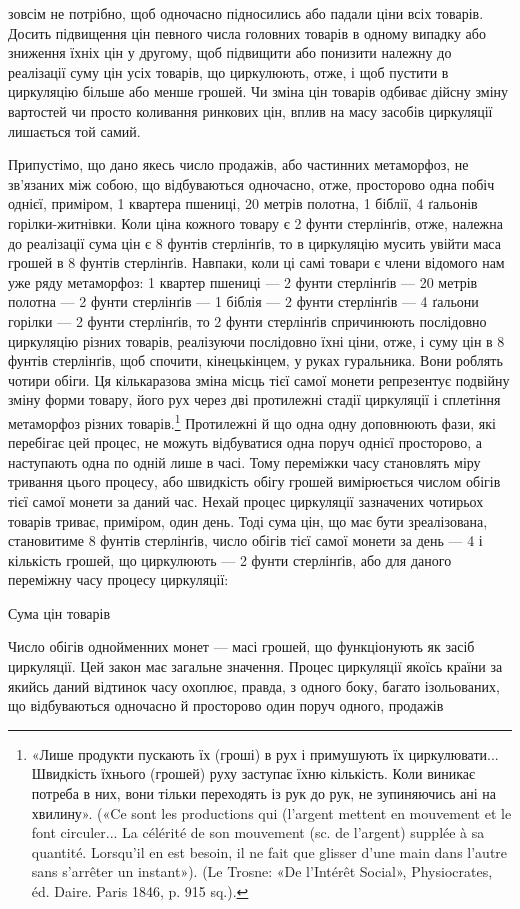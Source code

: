 зовсім не потрібно, щоб одночасно підносились або падали ціни
всіх товарів. Досить підвищення цін певного числа головних
товарів в одному випадку або зниження їхніх цін у другому,
щоб підвищити або понизити належну до реалізації суму цін
усіх товарів, що циркулюють, отже, і щоб пустити в циркуляцію
більше або менше грошей. Чи зміна цін товарів одбиває дійсну
зміну вартостей чи просто коливання ринкових цін, вплив на
масу засобів циркуляції лишається той самий.

Припустімо, що дано якесь число продажів, або частинних
метаморфоз, не зв’язаних між собою, що відбуваються одночасно,
отже, просторово одна побіч однієї, приміром, 1 квартера пшениці,
20 метрів полотна, 1 біблії, 4 ґальонів горілки-житнівки. Коли
ціна кожного товару є 2 фунти стерлінґів, отже, належна до реалізації
сума цін є 8 фунтів стерлінґів, то в циркуляцію мусить
увійти маса грошей в 8 фунтів стерлінґів. Навпаки, коли ці самі
товари є члени відомого нам уже ряду метаморфоз: 1 квартер
пшениці — 2 фунти стерлінґів — 20 метрів полотна — 2 фунти
стерлінґів — 1 біблія — 2 фунти стерлінґів — 4 ґальони горілки —
2 фунти стерлінґів, то 2 фунти стерлінґів спричинюють послідовно
циркуляцію різних товарів, реалізуючи послідовно їхні
ціни, отже, і суму цін в 8 фунтів стерлінґів, щоб спочити, кінецькінцем,
у руках гуральника. Вони роблять чотири обіги. Ця
кількаразова зміна місць тієї самої монети репрезентує подвійну
зміну форми товару, його рух через дві протилежні стадії циркуляції
і сплетіння метаморфоз різних товарів.\footnote{
«Лише продукти пускають їх (гроші) в рух і примушують їх
циркулювати... Швидкість їхнього (грошей) руху заступає їхню кількість.
Коли виникає потреба в них, вони тільки переходять із рук до рук, не
зупиняючись ані на хвилину». («Ce sont les productions qui (l’argent
mettent en mouvement et le font circuler... La célérité de son mouvement
(sc. de l’argent) supplée à sa quantité. Lorsqu’il en est besoin, il ne fait
que glisser d’une main dans l’autre sans s’arrêter un instant»). (Le Trosne:
«De l’Intérêt Social», Physiocrates, éd. Daire. Paris 1846, p. 915 sq.).
} Протилежні й
що одна одну доповнюють фази, які перебігає цей процес, не можуть
відбуватися одна поруч однієї просторово, а наступають
одна по одній лише в часі. Тому переміжки часу становлять міру
тривання цього процесу, або швидкість обігу грошей вимірюється
числом обігів тієї самої монети за даний час. Нехай процес
циркуляції зазначених чотирьох товарів триває, приміром, один
день. Тоді сума цін, що має бути зреалізована, становитиме
8 фунтів стерлінґів, число обігів тієї самої монети за день — 4
і кількість грошей, що циркулюють — 2 фунти стерлінґів, або
для даного переміжну часу процесу циркуляції:

Сума цін товарів

Число обігів однойменних монет — масі грошей, що функціонують
як засіб циркуляції. Цей закон має загальне значення.
Процес циркуляції якоїсь країни за якийсь даний відтинок часу
охоплює, правда, з одного боку, багато ізольованих, що відбуваються
одночасно й просторово один поруч одного, продажів
